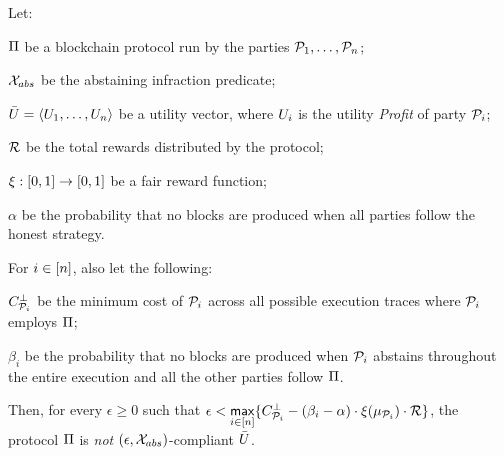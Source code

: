 \begin{theorem}\label{thm:universal-profit}
    Let:
    \begin{inparaenum}[i)]
        \item $\Pi$ be a blockchain protocol run by the parties $\mathcal{P}_1, \ldots, \mathcal{P}_n$;
        \item $\mathcal{X}_{abs}$ be the abstaining infraction predicate;
        \item $\bar{U}=\langle U_1, \ldots, U_n \rangle$ be a utility vector, where $U_i$ is the utility \emph{Profit} of party $\mathcal{P}_i$;
        \item $\mathcal{R}$ be the total rewards distributed by the protocol;
        \item $\xi: [0, 1] \rightarrow [0, 1]$ be a fair reward function;
        \item $\alpha$ be the probability that no blocks are produced when all parties follow the honest strategy.
    \end{inparaenum}

    For $i \in [n]$, also let the following:
    \begin{inparaenum}[i)]
        \item $C^\bot_{\mathcal{P}_i}$ be the minimum cost of $\mathcal{P}_i$ across all possible execution traces where $\mathcal{P}_i$ employs $\Pi$;
        \item $\beta_i$ be the probability that no blocks are produced when $\mathcal{P}_i$ abstains throughout the entire execution and all the other parties follow $\Pi$.
    \end{inparaenum}

     Then, for every $\epsilon\geq0$ such that
     $\epsilon < \underset{i \in [n]}{\mathsf{max}}\{C^\bot_{\mathcal{P}_i} - (\beta_i - \alpha) \cdot \xi(\mu_{\mathcal{P}_i}) \cdot \mathcal{R} \}$,
     the protocol $\Pi$ is \emph{not} $(\epsilon, \mathcal{X}_{abs})$-compliant \wrt $\bar{U}$.
\end{theorem}
